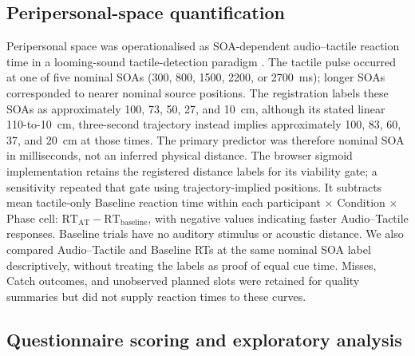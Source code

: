 \subsection{Peripersonal-space quantification}

Peripersonal space was operationalised as SOA-dependent audio--tactile reaction time in a looming-sound tactile-detection paradigm \citep{canzoneri2012dynamic, teneggi2013social, noel2015peripersonal}. The tactile pulse occurred at one of five nominal SOAs (300, 800, 1500, 2200, or 2700~ms); longer SOAs corresponded to nearer nominal source positions. The registration labels these SOAs as approximately 100, 73, 50, 27, and 10~cm, although its stated linear 110-to-10~cm, three-second trajectory instead implies approximately 100, 83, 60, 37, and 20~cm at those times. The primary predictor was therefore nominal SOA in milliseconds, not an inferred physical distance. The browser sigmoid implementation retains the registered distance labels for its viability gate; a sensitivity repeated that gate using trajectory-implied positions. It subtracts mean tactile-only Baseline reaction time within each participant $\times$ Condition $\times$ Phase cell: $\mathrm{RT}_{\mathrm{AT}}-\mathrm{RT}_{\mathrm{baseline}}$, with negative values indicating faster Audio--Tactile responses. Baseline trials have no auditory stimulus or acoustic distance. We also compared Audio--Tactile and Baseline RTs at the same nominal SOA label descriptively, without treating the labels as proof of equal cue time. Misses, Catch outcomes, and unobserved planned slots were retained for quality summaries but did not supply reaction times to these curves.

\subsection{Questionnaire scoring and exploratory analysis}

